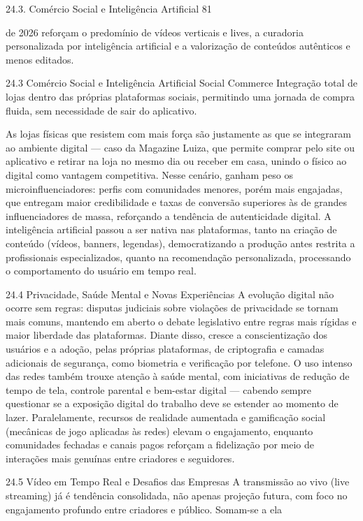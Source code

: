 24.3. Comércio Social e Inteligência Artificial 81

de 2026 reforçam o predomínio de vídeos verticais e lives, a curadoria personalizada por inteligência artificial e a valorização de conteúdos autênticos e menos editados.

24.3 Comércio Social e Inteligência Artificial Social Commerce Integração total de lojas dentro das próprias plataformas sociais, permitindo uma jornada de compra fluida, sem necessidade de sair do aplicativo.

As lojas físicas que resistem com mais força são justamente as que se integraram ao ambiente digital — caso da Magazine Luiza, que permite comprar pelo site ou aplicativo e retirar na loja no mesmo dia ou receber em casa, unindo o físico ao digital como vantagem competitiva. Nesse cenário, ganham peso os microinfluenciadores: perfis com comunidades menores, porém mais engajadas, que entregam maior credibilidade e taxas de conversão superiores às de grandes influenciadores de massa, reforçando a tendência de autenticidade digital. A inteligência artificial passou a ser nativa nas plataformas, tanto na criação de conteúdo (vídeos, banners, legendas), democratizando a produção antes restrita a profissionais especializados, quanto na recomendação personalizada, processando o comportamento do usuário em tempo real.

24.4 Privacidade, Saúde Mental e Novas Experiências A evolução digital não ocorre sem regras: disputas judiciais sobre violações de privacidade se tornam mais comuns, mantendo em aberto o debate legislativo entre regras mais rígidas e maior liberdade das plataformas. Diante disso, cresce a conscientização dos usuários e a adoção, pelas próprias plataformas, de criptografia e camadas adicionais de segurança, como biometria e verificação por telefone. O uso intenso das redes também trouxe atenção à saúde mental, com iniciativas de redução de tempo de tela, controle parental e bem-estar digital — cabendo sempre questionar se a exposição digital do trabalho deve se estender ao momento de lazer. Paralelamente, recursos de realidade aumentada e gamificação social (mecânicas de jogo aplicadas às redes) elevam o engajamento, enquanto comunidades fechadas e canais pagos reforçam a fidelização por meio de interações mais genuínas entre criadores e seguidores.

24.5 Vídeo em Tempo Real e Desafios das Empresas A transmissão ao vivo (live streaming) já é tendência consolidada, não apenas projeção futura, com foco no engajamento profundo entre criadores e público. Somam-se a ela


